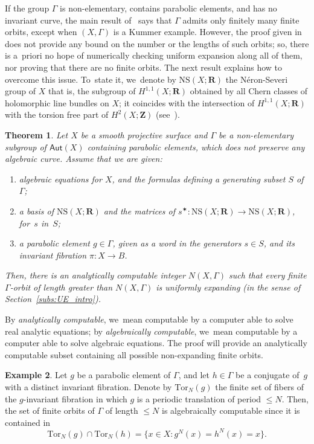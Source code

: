 \documentclass[JEP,XML,SOM,Unicode,published]{cedram}
\newenvironment{enumeratei}
{\bgroup\def\theenumi{\roman{enumi}}\def\theenumii{\arabic{enumii}}\begin{enumerate}}
{\end{enumerate}\egroup}
\let\sep :
\def\R{\mathbf{R}}
\def\Z{\mathbf{Z}}
\newcommand{\NS}{{\mathrm{NS}}}
\newcommand\Aut{\mathsf{Aut}}
\theoremstyle{plain}
\newtheorem{thm}{Theorem}[section]
\theoremstyle{definition}
\newtheorem{example}[thm]{Example}
\begin{document}
If the group $\Gamma$ is non-elementary, contains parabolic elements, and has no invariant curve, the main
result of~\cite{finite_orbits} says that $\Gamma$ admits only finitely many finite orbits, except when $(X,
\Gamma)$ is a Kummer example. However, the proof given in~\cite{finite_orbits} does not provide any bound
on the number or the lengths of such orbits; so, there is a~priori no hope of numerically checking
uniform expansion along all of them, nor proving that there are no finite orbits. The next result explains how to overcome this issue.
To~state it, we~denote by $\NS(X;\R)$ the Néron-Severi group of $X$ that is, the subgroup of $H^{1,1}(X;\R)$ obtained by all Chern classes of holomorphic line bundles on $X$; it coincides with the intersection of $H^{1,1}(X;\R)$ with the torsion free part of $H^2(X;\Z)$ (see~\cite[p.\,163]{griffiths-harris}).

\begin{thm}\label{thm:effective}
Let $X$ be a smooth projective surface and
$\Gamma$ be a non-elementary subgroup of $\Aut(X)$ containing parabolic elements, which does not
preserve any algebraic curve. Assume that we are given:
\begin{enumeratei}
\item\label{thm:effectivei}
algebraic equations for $X$, and the formulas defining a generating subset $S$ of~$\Gamma$;
\item\label{thm:effectiveii}
a basis of $\NS(X;\R)$ and the matrices of $s^\varstar\colon \NS(X;\R)\!\to\! \NS(X;\R)$, for~$s$ in~$S$;
\item\label{thm:effectiveiii}
a parabolic element $g\in \Gamma$, given as a word in the generators $s\in S$,
and its invariant fibration $\pi\colon X\to B$.
\end{enumeratei}
Then, there is an analytically computable integer $N(X, \Gamma)$
such that every finite $\Gamma$\nobreakdash-orbit of length greater than $N(X,\Gamma)$ is uniformly expanding (in the sense of Section~\ref{subs:UE_intro}).
\end{thm}

By \emph{analytically computable}, we~mean
computable by a computer able to solve real analytic equations; by \emph{algebraically computable}, we~mean
computable by a computer able to solve algebraic equations. The proof will provide an analytically computable subset containing all possible non-expanding finite orbits.

\begin{example} Let $g$ be a parabolic
element of $\Gamma$, and let $h\in \Gamma$ be a conjugate of~$g$ with a distinct invariant fibration.
Denote by $\mathrm{Tor}_N(g)$ the finite set of
fibers of the $g$-invariant fibration in which $g$ is a periodic translation of period $\leq N$.
Then, the set of finite orbits of $\Gamma$ of length $\leq N$ is algebraically computable since it is contained in
\begin{equation*}
\mathrm{Tor}_N(g)\cap \mathrm{Tor}_N(h) =\{x\in X\sep  g^N(x)=h^N(x)=x \}.
\end{equation*}
\end{example}
\end{document}
